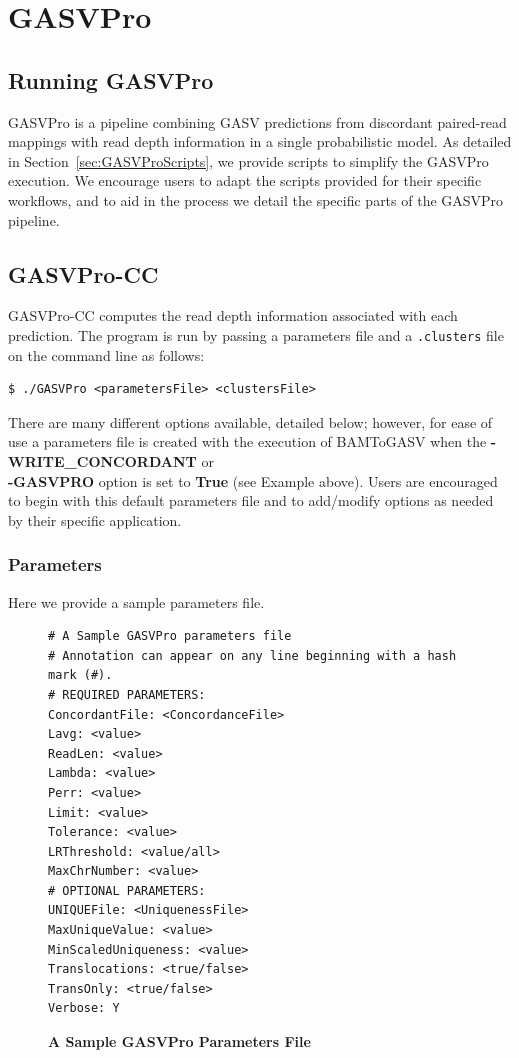 \documentclass[11pt]{article}
\begin{document}
\section{GASVPro}
\label{gasvprosec}

\subsection{Running GASVPro}

GASVPro is a pipeline combining GASV predictions from discordant paired-read mappings with read depth information in a single probabilistic model. As detailed in Section~\ref{sec:GASVProScripts}, we provide scripts to simplify the GASVPro execution. We encourage users to adapt the scripts provided for their specific workflows, and to aid in the process we detail the specific parts of the GASVPro pipeline.

\subsection{GASVPro-CC}

GASVPro-CC computes the read depth information associated with each prediction. The program is run by passing a parameters file and a \verb+.clusters+ file on the command line as follows:
\begin{Verbatim}[frame=single]
$ ./GASVPro <parametersFile> <clustersFile>
\end{Verbatim}
 There are many different options available, detailed below; however, for ease of use a parameters file is created with the execution of BAMToGASV when the {\bf-WRITE\_CONCORDANT} or {\bf \\-GASVPRO} option is set to {\bf True} (see Example above). Users are encouraged to begin with this default parameters file and to add/modify options as needed by their specific application.

\subsubsection{Parameters} 

Here we provide a sample parameters file. 
\begin{figure}[H]
\begin{Verbatim}[frame=single]
# A Sample GASVPro parameters file
# Annotation can appear on any line beginning with a hash mark (#).
# REQUIRED PARAMETERS:
ConcordantFile: <ConcordanceFile>
Lavg: <value>
ReadLen: <value>
Lambda: <value>
Perr: <value>
Limit: <value>
Tolerance: <value>
LRThreshold: <value/all>
MaxChrNumber: <value>
# OPTIONAL PARAMETERS: 
UNIQUEFile: <UniquenessFile>
MaxUniqueValue: <value>
MinScaledUniqueness: <value>
Translocations: <true/false>
TransOnly: <true/false>
Verbose: Y
\end{Verbatim}
\caption{\bf A Sample GASVPro Parameters File}
\end{figure}
\end{document}
